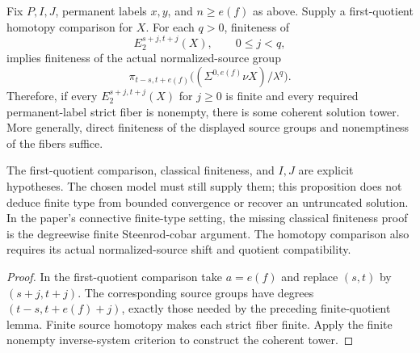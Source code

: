\begin{proposition}
  \label{prop:synthetic-coherent-tower-of-finite-e2}
  \leanok
  Fix $P,I,J$, permanent labels $x,y$, and $n\ge e(f)$ as above.
  Supply a first-quotient homotopy comparison for $X$.  For each $q>0$,
  finiteness of
  \[
    E_2^{s+j,t+j}(X),\qquad 0\le j<q,
  \]
  implies finiteness of the actual normalized-source group
  \[
    \pi_{t-s,t+e(f)}\bigl((\Sigma^{0,e(f)}\nu X)/\lambda^q\bigr).
  \]
  Therefore, if every $E_2^{s+j,t+j}(X)$ for $j\ge0$ is finite and
  every required permanent-label strict fiber is nonempty, there is some
  coherent solution tower.  More generally, direct finiteness of the
  displayed source groups and nonemptiness of the fibers suffice.

  The first-quotient comparison, classical finiteness, and $I,J$ are
  explicit hypotheses.  The chosen model must still supply them; this
  proposition does not deduce finite type from bounded convergence or
  recover an untruncated solution.  In the paper's connective finite-type
  setting, the missing classical finiteness proof is the degreewise finite
  Steenrod-cobar argument.  The homotopy comparison also requires its
  actual normalized-source shift and quotient compatibility.
\end{proposition}
\begin{proof}
  \leanok
  In the first-quotient comparison take $a=e(f)$ and replace $(s,t)$ by
  $(s+j,t+j)$.  The corresponding source groups have degrees
  $(t-s,t+e(f)+j)$, exactly those needed by the preceding finite-quotient
  lemma.  Finite source homotopy makes each strict fiber finite.  Apply
  the finite nonempty inverse-system criterion to construct the coherent
  tower.
\end{proof}

